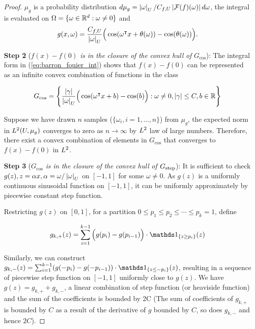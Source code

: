 \begin{proof}
    $\mu_g$ is a probability distribution $d\mu_g =
    \left| \omega \right|_{U}/C_{f,U}\left| \mathcal{F}(f)(\omega) \right| d\omega$, the integral is
    evaluated on $\Omega = \{\omega \in \mathbb{R}^d: \omega \not = 0\}$ and
    \begin{equation}
        g(x, \omega) = \frac{C_{f,U}}{\left| \omega \right|_{U}}
        \Big(
            \cos(\omega{}^{\intercal} x + \theta(\omega)) - \cos(\theta(\omega))
        \Big).
    \end{equation}

    \textbf{Step 2} (\textit{$f(x) - f(0)$ is in the closure of the convex hull
    of $G_{\cos}$}): The integral form in (\ref{eq:barron_fouier_int}) shows that
    $f(x) - f(0)$ can be represented as an infinite convex combination of
    functions in the class

    \begin{equation}
        G_{\cos} = \Bigg\{
            \frac{\left| \gamma \right|}{\left| \omega \right|_{U}}
            \Big(
                \cos(\omega{}^{\intercal} x + b) - \cos(b)
            \Big):
                \omega \not= 0, \left| \gamma \right| \leq C, b \in \mathbb{R} 
        \Bigg\}
    \end{equation}

    Suppose we have drawn $n$ samples ($\{\omega_i, i = 1,\dots, n\}$) from
    $\mu_g$, the expected norm in $L^{2}(U, \mu_g)$ converges to zero as $n \to
    \infty$ by $L^{2}$ law of large numbers. Therefore, there exist a convex
    combination of elements in $G_{\cos}$ that converges to $f(x) - f(0)$ in
    $L^{2}$.


    \textbf{Step 3} (\textit{$G_{\cos}$ is in the closure of the convex hull of
    $G_{\textnormal{step}}$}): It is sufficient to check $g(z), z = \alpha x,
    \alpha = \omega/\left| \omega \right|_{U}$ on $[-1, 1]$ for some $\omega \not= 0$. As
    $g(z)$ is a uniformly continuous sinusoidal function on $[-1, 1]$, it can be
    uniformly approximately by piecewise constant step function.

    Restricting $g(z)$ on $[0, 1]$, for a partition ${0 \leq p_1 \leq p_2 \leq
    \cdots \leq p_k = 1}$, define

    \begin{align}
        g_{k,+}(z) = \sum_{i=1}^{k-1} \Big(g(p_i) - g(p_{i-1})\Big) \cdot
        \indicator{\{z\geq p_i\}}(z)
    \end{align}

    Similarly, we can construct $g_{k,-}(z) = \sum_{i=1}^{k-1} (g(-p_i) -
    g(-p_{i-1})) \cdot \indicator{\{z\leq -p_i\}}(z)$, resulting in a sequence
    of piecewise step function on $[-1, 1]$ uniformly close to $g(z)$. We have
    $g(z) = g_{k,+}+g_{k,-}$, a linear combination of step function (or
    heaviside function) and the sum of the coefficients is bounded by 2C (The
    sum of coefficients of $g_{k,+}$ is bounded by $C$ as a result of the
    derivative of $g$ bounded by $C$, so does $g_{k,-}$ and hence $2C$).


\end{proof}

